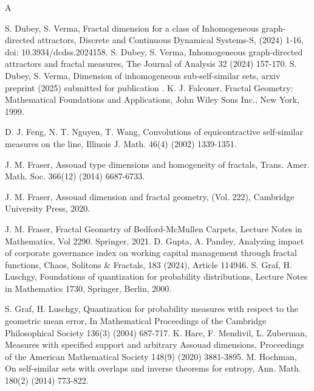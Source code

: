 \documentclass{amsproc}
\theoremstyle{definition}
\theoremstyle{remark}
\numberwithin{equation}{section}
\begin{document}
\begin{thebibliography}{A}

 S. Dubey, S. Verma, Fractal dimension for a class of Inhomogeneous graph-directed attractors, Discrete and Continuous Dynamical Systems-S, (2024) 1-16, doi: 10.3934/dcdss.2024158.
  S. Dubey, S. Verma, Inhomogeneous graph-directed attractors and fractal measures, The Journal of Analysis 32 (2024) 157-170.
  S. Dubey, S. Verma, Dimension of inhomogeneous sub-self-similar sets, arxiv preprint (2025) submitted for publication .
 K. J. Falconer, Fractal Geometry: Mathematical Foundations and Applications, John Wiley Sons Inc., New York, 1999.

 D. J. Feng, N. T. Nguyen, T. Wang, Convolutions of equicontractive self-similar measures on the line, Illinois J. Math. 46(4) (2002) 1339-1351.

 J. M. Fraser, Assouad type dimensions and homogeneity of fractals, Trans. Amer. Math. Soc. 366(12) (2014) 6687-6733.

 J. M. Fraser, Assouad dimension and fractal geometry, (Vol. 222), Cambridge University Press, 2020.

 J. M. Fraser, Fractal Geometry of Bedford-McMullen Carpets, Lecture Notes in Mathematics, Vol 2290. Springer, 2021. 
      D. Gupta, A. Pandey, Analyzing impact of corporate governance index on working capital management through fractal functions,
Chaos, Solitons \& Fractals, 183 (2024), Article 114946.
     S. Graf, H. Luschgy, Foundations of quantization for probability distributions, Lecture Notes in
    Mathematics 1730, Springer, Berlin, 2000.

    

     S. Graf, H. Luschgy, Quantization for probability measures with respect to the geometric mean error, In Mathematical Proceedings of the Cambridge Philosophical Society 136(3) (2004) 687-717.
 K. Hare, F. Mendivil, L. Zuberman, Measures with specified support and arbitrary Assouad dimensions, Proceedings of the American Mathematical Society 148(9) (2020) 3881-3895.
  M. Hochman, On self-similar sets with overlaps and inverse theorems for entropy, Ann. Math. 180(2) (2014) 773-822.



\end{thebibliography}
\end{document}
